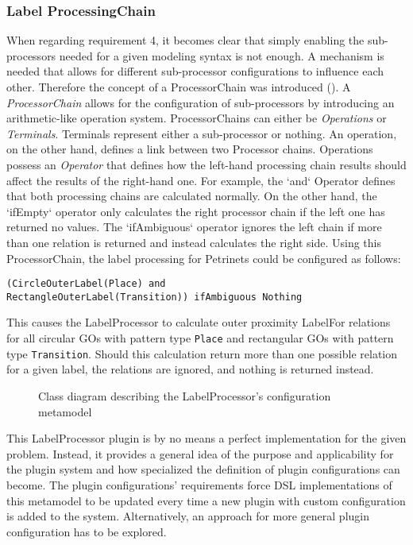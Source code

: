 \subsubsection{Label ProcessingChain}
When regarding requirement 4, it becomes clear that simply enabling the sub-processors needed for a given modeling syntax is not enough. A mechanism is needed that allows for different sub-processor configurations to influence each other. Therefore the concept of a ProcessorChain was introduced (). A \emph{ProcessorChain} allows for the configuration of sub-processors by introducing an arithmetic-like operation system. ProcessorChains can either be \emph{Operations} or \emph{Terminals}. Terminals represent either a sub-processor or nothing. An operation, on the other hand, defines a link between two Processor chains. Operations possess an \emph{Operator} that defines how the left-hand processing chain results should affect the results of the right-hand one. For example, the `and` Operator defines that both processing chains are calculated normally. On the other hand, the `ifEmpty` operator only calculates the right processor chain if the left one has returned no values. The `ifAmbiguous` operator ignores the left chain if more than one relation is returned and instead calculates the right side. Using this ProcessorChain, the label processing for Petrinets could be configured as follows:
\begin{lstlisting}
(CircleOuterLabel(Place) and 
RectangleOuterLabel(Transition)) ifAmbiguous Nothing
\end{lstlisting}
This causes the LabelProcessor to calculate outer proximity LabelFor relations for all circular GOs with pattern type \texttt{Place} and rectangular GOs with pattern type \texttt{Transition}. Should this calculation return more than one possible relation for a given label, the relations are ignored, and nothing is returned instead.

\begin{figure}[ht]
  \centering
  
  \caption{Class diagram describing the LabelProcessor's configuration metamodel}
  \label{fig:labelprocessor-config}
\end{figure}

This LabelProcessor plugin is by no means a perfect implementation for the given problem. Instead, it provides a general idea of the purpose and applicability for the plugin system and how specialized the definition of plugin configurations can become. The plugin configurations' requirements force DSL implementations of this metamodel to be updated every time a new plugin with custom configuration is added to the system. Alternatively, an approach for more general plugin configuration has to be explored.


